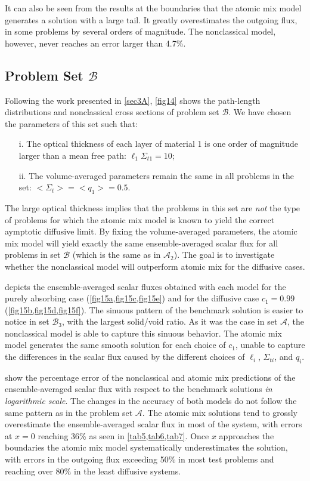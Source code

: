 \documentclass[12pt]{article}
\newcommand{\bl}{\big<}
\newcommand{\bg}{\big>}
\newcommand{\seta}{\mathcal{A}}
\newcommand{\setb}{\mathcal{B}}
\begin{document}
{It can also be seen from the results at the boundaries that the atomic mix model generates a solution with a large tail. It greatly overestimates the outgoing flux, in some problems by several orders of magnitude. The nonclassical model, however, never reaches an error larger than 4.7\%.

\subsection{Problem Set $\setb$}

Following the work presented in \cref{sec3A}, \cref{fig14} shows the path-length distributions and nonclassical cross sections of problem set $\setb$. We have chosen the parameters of this set such that:
\begin{itemize}
\item[i.] The optical thickness of each layer of material 1 is one order of magnitude larger than a mean free path: $\ell_1\Sigma_{t1} = 10$;
\vspace{-4pt}
\item[ii.] The volume-averaged parameters remain the same in all problems in the set: $\bl \Sigma_t \bg = \bl q_1 \bg = 0.5$.
\end{itemize}
The large optical thickness implies that the problems in this set are {\em not} the type of problems for which the atomic mix model is known to yield the correct aymptotic diffusive limit. By fixing the volume-averaged parameters, the atomic mix model will yield exactly the same ensemble-averaged scalar flux for all problems in set $\setb$ (which is the same as in $\seta_2$). The goal is to investigate whether the nonclassical model will outperform atomic mix for the diffusive cases.

 depicts the ensemble-averaged scalar fluxes obtained with each model for the purely absorbing case (\cref{fig15a,fig15c,fig15e}) and for the diffusive case $c_1=0.99$ (\cref{fig15b,fig15d,fig15f}). The sinuous pattern of the benchmark solution is easier to notice in set $\setb_3$, with the largest solid/void ratio. As it was the case in set $\seta$, the
nonclassical model is able to capture this sinuous behavior. The atomic mix model generates the same smooth solution for each choice of $c_1$, unable to capture the differences in the scalar flux caused by the different choices of $\ell_i$, $\Sigma_{ti}$, and $q_i$.

 show the percentage error of the nonclassical and atomic mix predictions of the ensemble-averaged scalar flux with respect to the benchmark solutions {\em in logarithmic scale}. The changes in the accuracy of both models do not follow the same pattern as in the problem set $\seta$. The atomic mix solutions tend to grossly overestimate the ensemble-averaged scalar flux in most of the system, with errors at $x=0$ reaching 36\% as seen in \cref{tab5,tab6,tab7}. Once $x$ approaches the boundaries the atomic mix model systematically underestimates the solution, with errors in the outgoing flux exceeding 50\% in most test problems and reaching over 80\% in the least diffusive systems.

}
\end{document}
